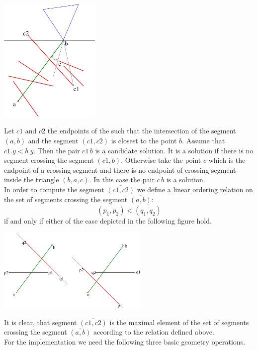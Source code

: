 \begin{center}
\includegraphics[height=6cm]{img/abra14.pdf}
\end{center}
Let $c1$ and $c2$ the endpoints of the  such that the intersection of the segment $(a,b)$ and the segment $(c1,c2)$ is closest to the point $b$. Assume that $c1.y<b.y$. Then the pair  $c1 \, b$ is a candidate solution. It is a solution if there is no segment crossing the segment $(c1, b)$. Otherwise take the point $c$ which is the endpoint of a crossing segment and there is no endpoint of crossing segment inside the triangle $(b,a,c)$. In this case the pair $c \, b$ is a solution.\\
In order to compute the segment $\overline{(c1,c2)}$ we define a linear ordering relation on the set of segments crossing the segment $\overline{(a,b)}$:\\
$$\overline{(p_1,p_2)} < \overline{(q_1,q_2)}$$
if and only if either of the case depicted in the  following figure hold.
\begin{center}
\includegraphics[height=4cm]{img/abra15.pdf}
\end{center}
It is clear, that segment $\overline{(c1,c2)}$ is the maximal element of the set of segments crossing the segment $\overline{(a,b)}$ according to the relation defined above. \\
For the implementation we need the following three basic geometry operations.\\
